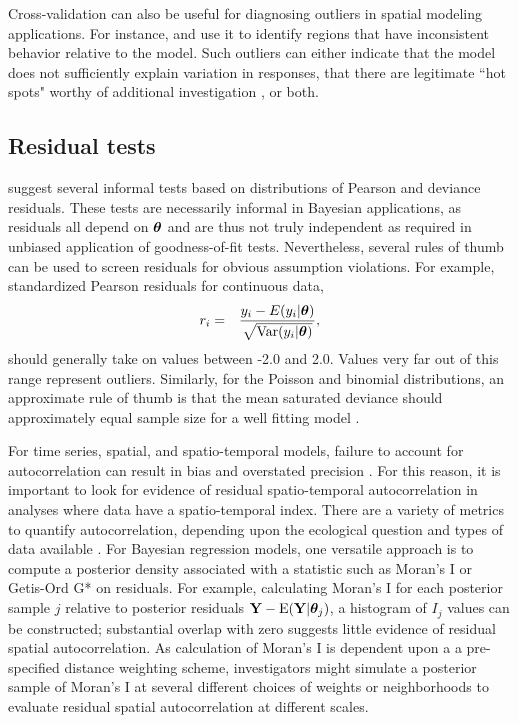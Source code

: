 \documentclass[12pt,english]{article}
\begin{document}
\begin{spacing}{1.9}
Cross-validation can also be useful for diagnosing outliers in spatial modeling applications.  For instance, \citet{SternCressie2000} and \citet{MarshallSpiegelhalter2003} use it to identify regions that have inconsistent behavior relative to the model.  Such outliers can either indicate that the model does not sufficiently explain variation in responses, that there are legitimate ``hot spots" worthy of additional investigation \citep{MarshallSpiegelhalter2003}, or both.

\subsection{Residual tests}

\citet{LunnEtAl2013} suggest several informal tests based on distributions of Pearson and deviance residuals.  These tests are necessarily informal in Bayesian applications, as residuals all depend on $\boldsymbol{\theta}$ and are thus not truly independent as required in unbiased application of goodness-of-fit tests.  Nevertheless, several rules of thumb can be used to screen residuals for obvious assumption violations.  For example, standardized Pearson residuals for continuous data,
\begin{eqnarray*}
  r_i & = & \frac{y_i - E(y_i|\boldsymbol{\theta})}{\sqrt{\textrm{Var}(y_i | \boldsymbol{\theta})}},
\end{eqnarray*}
should generally take on values between -2.0 and 2.0.  Values very far out of this range represent outliers.
Similarly, for the Poisson and binomial distributions, an approximate rule of thumb is that the mean saturated deviance should approximately equal sample size for a well fitting model \citep{LunnEtAl2013}.

For time series, spatial, and spatio-temporal models, failure to account for autocorrelation can result in bias and overstated precision \citep{LichsteinEtAl2002}.  For this reason, it is important to look for evidence of residual spatio-temporal autocorrelation in analyses where data have a spatio-temporal index.  There are a variety of metrics to quantify autocorrelation, depending upon the ecological question and types of data available \cite[e.g.,][]{PerryEtAl2002}.  For Bayesian regression models, one versatile approach is to compute a posterior density associated with a statistic such as Moran's I \citep{Moran1950} or Getis-Ord G* \citep{GetisOrd1992} on residuals.  For example, calculating Moran's I for each posterior sample $j$ relative to posterior residuals ${\bf Y} - \textrm{E}({\bf Y} | \boldsymbol{\theta}_j)$, a histogram of $I_j$ values can be constructed; substantial overlap with zero suggests little evidence of residual spatial autocorrelation.  As calculation of Moran's I is dependent upon a a pre-specified distance weighting scheme, investigators might simulate a posterior sample of Moran's I at several different choices of weights or neighborhoods to evaluate residual spatial autocorrelation at different scales.


\end{spacing}
\end{document}
